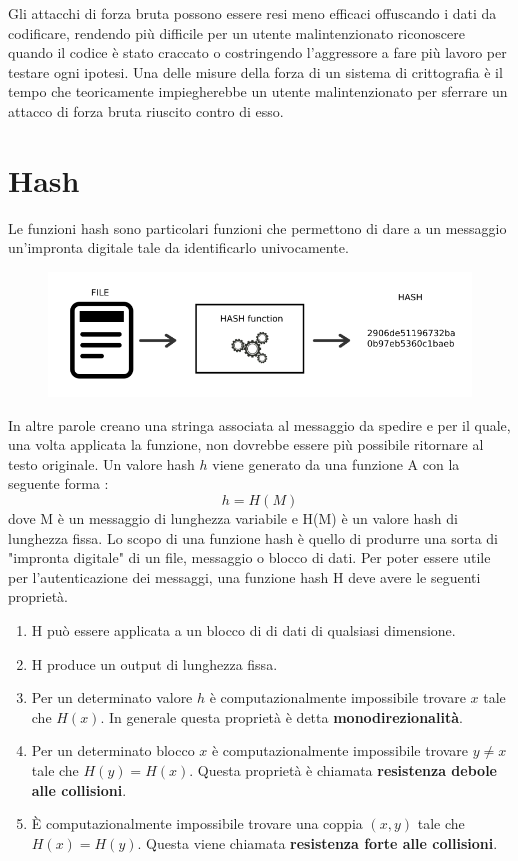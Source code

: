 Gli attacchi di forza bruta possono essere resi meno efficaci offuscando i dati da codificare, rendendo più difficile per un utente malintenzionato riconoscere quando il codice è stato craccato o costringendo l'aggressore a fare più lavoro per testare ogni ipotesi. Una delle misure della forza di un sistema di crittografia è il tempo che teoricamente impiegherebbe un utente malintenzionato per sferrare un attacco di forza bruta riuscito contro di esso.
\section{Hash}
Le funzioni hash \cite{hash} sono particolari funzioni che permettono di dare a un messaggio un’impronta digitale tale da identificarlo univocamente.
\begin{figure}[h]
    \centering
    \includegraphics[width=115mm]{Immagini/introduzione/hash.png}
    \label{fig:hash}
\end{figure}

In altre parole creano una stringa associata al messaggio da spedire e per il quale, una volta applicata la funzione, non dovrebbe essere più possibile ritornare al testo originale.
Un valore hash \(h\) viene generato da una funzione A con la seguente forma :
\[ h = H(M)\]
dove M è un messaggio di lunghezza variabile e H(M) è un valore hash di lunghezza fissa.
Lo scopo di una funzione hash è quello di produrre una sorta di "impronta digitale" di un file, messaggio o blocco di dati. Per poter essere utile per l'autenticazione dei messaggi, una funzione hash H deve avere le seguenti proprietà.
\begin{enumerate}
    \item H può essere applicata a un blocco di di dati di qualsiasi dimensione.
    \item H produce un output di lunghezza fissa.
    \item Per un determinato valore \(h\) è computazionalmente impossibile trovare \(x\) tale che \(H(x)\). In generale questa proprietà è detta \textbf{monodirezionalità}.
    \item Per un determinato blocco \(x\) è computazionalmente impossibile trovare \(y \neq x\) tale che \(H(y) = H(x)\). Questa proprietà è chiamata \textbf{resistenza debole alle collisioni}.
    \item È computazionalmente impossibile trovare una coppia \((x, y)\) tale che \(H(x) = H(y)\). Questa viene chiamata \textbf{resistenza forte alle collisioni}.
\end{enumerate}

